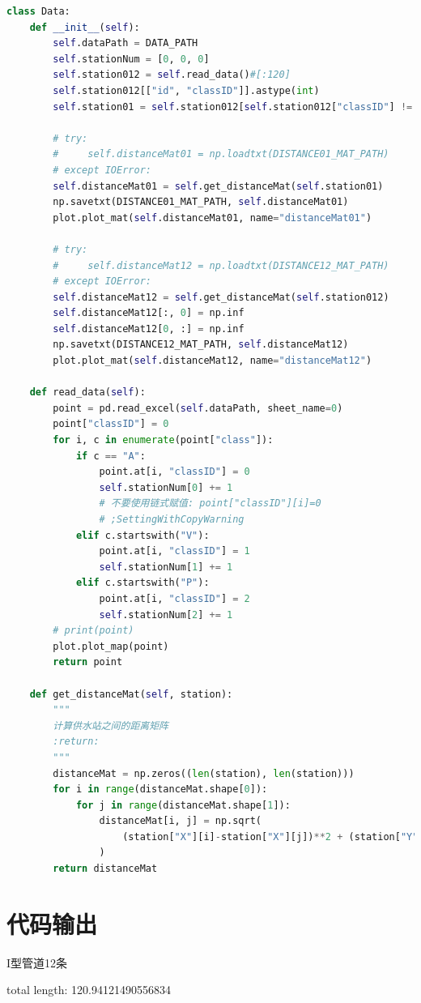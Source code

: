 \documentclass{cumcmthesis}
\begin{document}
\begin{appendices}
\begin{lstlisting}[language=python]
class Data:
    def __init__(self):
        self.dataPath = DATA_PATH
        self.stationNum = [0, 0, 0]
        self.station012 = self.read_data()#[:120]
        self.station012[["id", "classID"]].astype(int)
        self.station01 = self.station012[self.station012["classID"] != 2].reset_index(drop=True)

        # try:
        #     self.distanceMat01 = np.loadtxt(DISTANCE01_MAT_PATH)
        # except IOError:
        self.distanceMat01 = self.get_distanceMat(self.station01)
        np.savetxt(DISTANCE01_MAT_PATH, self.distanceMat01)
        plot.plot_mat(self.distanceMat01, name="distanceMat01")

        # try:
        #     self.distanceMat12 = np.loadtxt(DISTANCE12_MAT_PATH)
        # except IOError:
        self.distanceMat12 = self.get_distanceMat(self.station012)
        self.distanceMat12[:, 0] = np.inf
        self.distanceMat12[0, :] = np.inf
        np.savetxt(DISTANCE12_MAT_PATH, self.distanceMat12)
        plot.plot_mat(self.distanceMat12, name="distanceMat12")

    def read_data(self):
        point = pd.read_excel(self.dataPath, sheet_name=0)
        point["classID"] = 0
        for i, c in enumerate(point["class"]):
            if c == "A":
                point.at[i, "classID"] = 0
                self.stationNum[0] += 1
                # 不要使用链式赋值: point["classID"][i]=0
                # ;SettingWithCopyWarning
            elif c.startswith("V"):
                point.at[i, "classID"] = 1
                self.stationNum[1] += 1
            elif c.startswith("P"):
                point.at[i, "classID"] = 2
                self.stationNum[2] += 1
        # print(point)
        plot.plot_map(point)
        return point

    def get_distanceMat(self, station):
        """
        计算供水站之间的距离矩阵
        :return:
        """
        distanceMat = np.zeros((len(station), len(station)))
        for i in range(distanceMat.shape[0]):
            for j in range(distanceMat.shape[1]):
                distanceMat[i, j] = np.sqrt(
                    (station["X"][i]-station["X"][j])**2 + (station["Y"][i]-station["Y"][j])**2
                )
        return distanceMat
  \end{lstlisting}
  \section{代码输出}
I型管道12条

total length: 120.94121490556834


\end{appendices}
\end{document}
